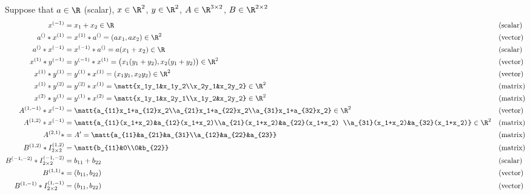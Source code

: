 \documentclass[11pt]{article}
\theoremstyle{remark}
\begin{document}
Suppose that $a\in\R$ (scalar), $x\in\R^2$, $y\in\R^2$, $A\in\R^{3\times 2}$, $B\in\R^{2\times 2}$
\begin{align*}
  x^{(-1)} &= x_1+x_2\in\R && \text{(scalar)}\\
  a^{()} * x^{(1)} &= x^{(1)} * a^{()} =(a x_1, a x_2) \in \R^2 && \text{(vector)}\\
  a^{()} * x^{(-1)} &= x^{(-1)} * a^{()} = a (x_1+x_2) \in\R && \text{(scalar)}\\
  x^{(1)} * y^{(-1)} &= y^{(-1)} * x^{(1)} =\big(x_1 (y_1+y_2), x_2 (y_1+y_2)\big) \in\R^2 && \text{(vector)}\\
  x^{(1)} * y^{(1)} &= y^{(1)} * x^{(1)} =(x_1 y_1, x_2 y_2) \in\R^2 && \text{(vector)}\\
  x^{(1)} * y^{(2)} &= y^{(2)} * x^{(1)}=\matt{x_1y_1&x_1y_2\\x_2y_1&x_2y_2} \in\R^2 && \text{(matrix)}\\
  x^{(2)} * y^{(1)} &=  y^{(1)} * x^{(2)}=\matt{x_1y_1&x_2y_1\\x_1y_2&x_2y_2} \in\R^2 && \text{(matrix)}\\
  A^{(1,-1)} * x^{(-1)} &= \matt{a_{11}x_1+a_{12}x_2\\a_{21}x_1+a_{22}x_2\\a_{31}x_1+a_{32}x_2}\in\R^2 &&\text{(vector)}\\
  A^{(1,2)} * x^{(-1)} &= \matt{a_{11}(x_1+x_2)&a_{12}(x_1+x_2)\\a_{21}(x_1+x_2)&a_{22}(x_1+x_2) \\a_{31}(x_1+x_2)&a_{32}(x_1+x_2)}\in\R^2&& \text{(matrix)}\\
  A^{(2,1)} * &= A'=\matt{a_{11}&a_{21}&a_{31}\\a_{12}&a_{22}&a_{23}}&& \text{(matrix)}\\
  B^{(1,2)} * I_{2\times 2}^{(1,2)}&=\matt{b_{11}&0\\0&b_{22}}&& \text{(matrix)}\\
  B^{(-1,-2)} * I_{2\times 2}^{(-1,-2)}&=b_{11}+b_{22}&& \text{(scalar)}\\
  B^{(1,1)} * &= (b_{11},b_{22}) && \text{(vector)}\\
  B^{(1,-1)} * I_{2\times 2}^{(1,-1)}&=(b_{11},b_{22}) && \text{(vector)}\\
\end{align*}
\end{document}
